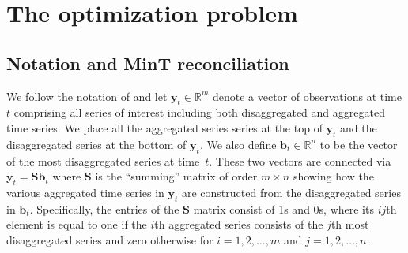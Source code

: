 \documentclass[twocolumn]{svjour3}
\begin{document}
\section{The optimization problem}

\subsection{Notation and MinT reconciliation}

We follow the notation of \citet{Wick2018} and let $\bm{y}_t \in \mathbb{R}^m$ denote a vector of observations at time $t$ comprising all series of interest including both disaggregated and aggregated time series. We place all the aggregated series series at the top of $\bm{y}_t$ and the disaggregated series at the bottom of  $\bm{y}_t$. We also define $\bm{b}_t \in \mathbb{R}^n$ to be the vector of the most disaggregated series at time~$t$. These two vectors are connected via $\bm{y}_t=\bm{S}\bm{b}_t$ where $\bm{S}$ is the ``summing'' matrix of order $m \times n$ showing how the various aggregated time series in $\bm{y}_t$ are constructed from the disaggregated series in $\bm{b}_t$. Specifically, the entries of the $\bm{S}$ matrix consist of 1s and 0s, where its $ij$th element is equal to one if the $i$th aggregated series consists of the $j$th most disaggregated series and zero otherwise for $i = 1, 2, \dots, m$ and $j = 1, 2, \dots, n$.
\end{document}
